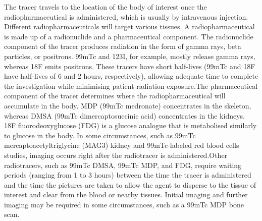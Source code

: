 \documentclass[12pt]{article}
\begin{document}
\par
The tracer travels to the location of the body of interest once the radiopharmaceutical is administered, which is usually by intravenous injection. Different radiopharmaceuticals will target various tissues.
A radiopharmaceutical is made up of a radionuclide and a pharmaceutical component. The radionuclide component of the tracer produces radiation in the form of gamma rays, beta particles, or positrons. 99mTc and 123I, for example, mostly release gamma rays, whereas 18F emits positrons. These tracers have short half-lives (99mTc and 18F have half-lives of 6 and 2 hours, respectively), allowing adequate time to complete the investigation while minimising patient radiation exposure.The pharmaceutical component of the tracer determines where the radiopharmaceutical will accumulate in the body. MDP (99mTc medronate) concentrates in the skeleton, whereas DMSA (99mTc dimercaptosuccinic acid) concentrates in the kidneys. 18F fluorodeoxyglucose (FDG) is a glucose analogue that is metabolised similarly to glucose in the body. In some circumstances, such as 99mTc mercaptoacetyltriglycine (MAG3) kidney and 99mTc-labeled red blood cells studies, imaging occurs right after the radiotracer is administered.Other radiotracers, such as 99mTc DMSA, 99mTc MDP, and FDG, require waiting periods (ranging from 1 to 3 hours) between the time the tracer is administered and the time the pictures are taken to allow the agent to disperse to the tissue of interest and clear from the blood or nearby tissues. Initial imaging and further imaging may be required in some circumstances, such as a 99mTc MDP bone scan.
\end{document}
